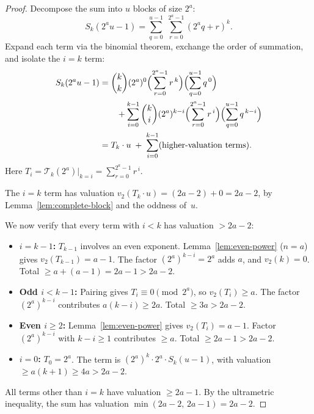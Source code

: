 \documentclass[12pt,a4paper]{article}
\theoremstyle{plain}
\theoremstyle{definition}
\newcommand{\Tk}{\mathcal{T}_{k}}
\begin{document}
\begin{proof}
  Decompose the sum into $u$ blocks of size $2^a$:
  \[
    S_k(2^a u - 1) = \sum_{q=0}^{u-1} \; \sum_{r=0}^{2^a-1} (2^a q + r)^k.
  \]
  Expand each term via the binomial theorem, exchange the order of summation,
  and isolate the $i=k$ term:
  \begin{align}\label{eq:block-exp}
    S_k(2^a u - 1)
    &= \binom{k}{k} (2^a)^0 \Bigl( \sum_{r=0}^{2^a-1} r^{\,k} \Bigr)
       \Bigl( \sum_{q=0}^{u-1} q^{\,0} \Bigr) \nonumber\\
    &\qquad + \sum_{i=0}^{k-1} \binom{k}{i} (2^a)^{k-i}
       \Bigl( \sum_{r=0}^{2^a-1} r^{\,i} \Bigr)
       \Bigl( \sum_{q=0}^{u-1} q^{\,k-i} \Bigr) \nonumber\\
    &= T_k \cdot u \;+\; \sum_{i=0}^{k-1} (\text{higher-valuation terms}).
  \end{align}
  Here $T_i = \Tk(2^a)\big|_{k=i} = \sum_{r=0}^{2^a-1} r^{\,i}$.

  The $i=k$ term has valuation $v_2(T_k \cdot u) = (2a-2) + 0 = 2a-2$,
  by Lemma~\ref{lem:complete-block} and the oddness of~$u$.

  We now verify that every term with $i < k$ has valuation $> 2a-2$:
  \begin{itemize}[nosep]
    \item \textbf{$i = k-1$:} $T_{k-1}$ involves an even exponent.
      Lemma~\ref{lem:even-power} ($n = a$) gives $v_2(T_{k-1}) = a-1$.
      The factor $(2^a)^{k-i} = 2^a$ adds $a$, and $v_2(k)=0$.
      Total $\ge a + (a-1) = 2a-1 > 2a-2$.

    \item \textbf{Odd $i < k-1$:} Pairing gives $T_i \equiv 0 \pmod{2^a}$,
      so $v_2(T_i) \ge a$.  The factor $(2^a)^{k-i}$ contributes
      $a(k-i) \ge 2a$.  Total $\ge 3a > 2a-2$.

    \item \textbf{Even $i \ge 2$:} Lemma~\ref{lem:even-power} gives
      $v_2(T_i) = a-1$.  Factor $(2^a)^{k-i}$ with $k-i \ge 1$ contributes
      $\ge a$.  Total $\ge 2a-1 > 2a-2$.

    \item \textbf{$i = 0$:} $T_0 = 2^a$.  The term is $(2^a)^k \cdot 2^a
      \cdot S_k(u-1)$, with valuation $\ge a(k+1) \ge 4a > 2a-2$.
  \end{itemize}

  All terms other than $i=k$ have valuation $\ge 2a-1$.  By the ultrametric
  inequality, the sum has valuation $\min(2a-2,\, 2a-1) = 2a-2$.
\end{proof}
\end{document}
